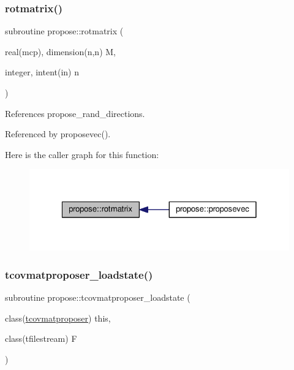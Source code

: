 \subsubsection{\texorpdfstring{rotmatrix()}{rotmatrix()}}
{\footnotesize\ttfamily subroutine propose\+::rotmatrix (\begin{DoxyParamCaption}\item[{real(mcp), dimension(n,n)}]{M,  }\item[{integer, intent(in)}]{n }\end{DoxyParamCaption})}



References propose\+\_\+rand\+\_\+directions.



Referenced by proposevec().

Here is the caller graph for this function\+:
\nopagebreak
\begin{figure}[H]
\begin{center}
\leavevmode
\includegraphics[width=320pt]{namespacepropose_a3315b3e0b92d1cf9fa29628d291634de_icgraph}
\end{center}
\end{figure}
\mbox{\label{namespacepropose_aa4a55115a922af4c660ba77e969a2fc1}} 
\subsubsection{\texorpdfstring{tcovmatproposer\+\_\+loadstate()}{tcovmatproposer\_loadstate()}}
{\footnotesize\ttfamily subroutine propose\+::tcovmatproposer\+\_\+loadstate (\begin{DoxyParamCaption}\item[{class(\mbox{\hyperlink{structpropose_1_1tcovmatproposer}{tcovmatproposer}})}]{this,  }\item[{class(tfilestream)}]{F }\end{DoxyParamCaption})}

